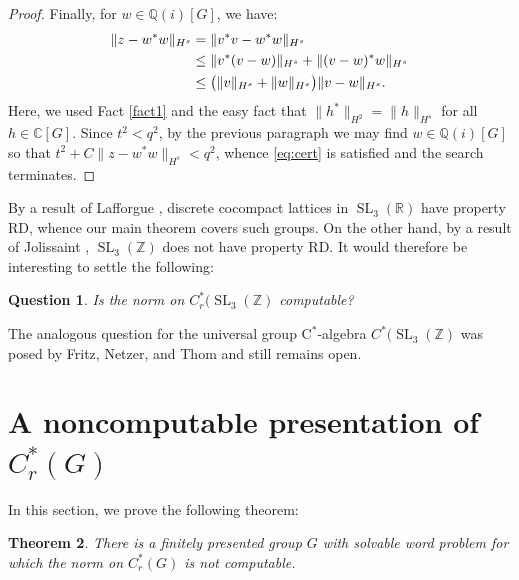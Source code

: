 \documentclass[10pt,a4paper]{amsart}
\newcommand{\Q}{\mathbb{Q}}
\newcommand{\cstar}{$\mathrm{C}^*$}
\newcommand{\Qi}{\Q(i)}
\theoremstyle{plain}
\newtheorem{theorem}{Theorem}[section]
\newtheorem{question}[theorem]{Question}
\theoremstyle{definition}
\numberwithin{equation}{section}
\begin{document}
\begin{proof}
Finally, for $w\in \Qi[G]$, we have:
\begin{alignat}{2}
\|z-w^*w\|_{H^s}&=\|v^*v-w^*w\|_{H^s} \notag \\ \notag
    &\le\|v^*(v-w)\|_{H^s}+\|(v-w)^*w\|_{H^s}\\ \notag
&\le \big(\|v\|_{H^{s}}+\|w\|_{H^{s}}\big)\|v-w\|_{H^{s}}.\notag
\end{alignat}
Here, we used Fact \ref{fact1} and the easy fact that $\|h^*\|_{H^2}=\|h\|_{H^s}$ for all $h\in \mathbb{C}[G]$.  Since $t^2<q^2$, by the previous paragraph we may find $w\in \Qi[G]$ so that $t^2+C\|z-w^*w\|_{H^s}<q^2$, whence \eqref{eq:cert} is satisfied and the search terminates.
\end{proof}

By a result of Lafforgue \cite{lafforgue}, discrete cocompact lattices in $\operatorname{SL}_3(\mathbb{R})$ have property RD, whence our main theorem covers such groups.  On the other hand, by a result of Jolissaint \cite[Theorem B]{jolissaint}, $\operatorname{SL}_3(\mathbb{Z})$ does not have property RD.  It would therefore be interesting to settle the following:

\begin{question}
Is the norm on $C^*_r(\operatorname{SL}_3(\mathbb{Z})$ computable?
\end{question}

The analogous question for the universal group \cstar-algebra $C^*(\operatorname{SL}_3(\mathbb{Z})$ was posed by Fritz, Netzer, and Thom \cite[Question 2.6]{canyou} and still remains open.

\section{A noncomputable presentation of $C^*_r(G)$}

In this section, we prove the following theorem:


\begin{theorem}
There is a finitely presented group $G$ with solvable word problem for which the norm on $C^*_r(G)$ is not computable.
\end{theorem}
\end{document}
